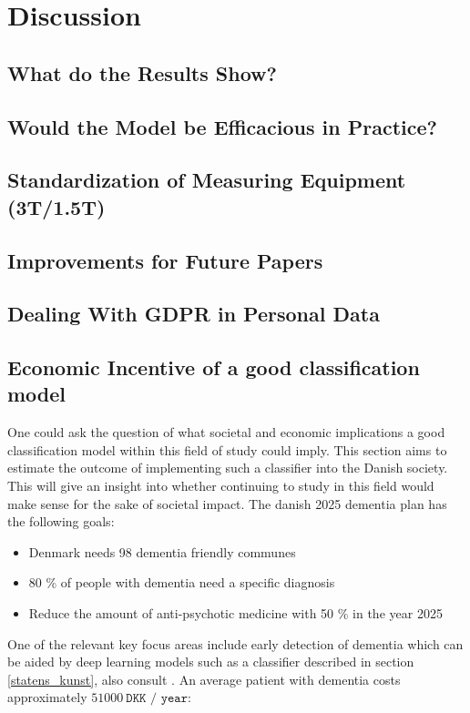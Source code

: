 \documentclass[12pt, fleqn, titlepage]{article}
\begin{document}
\section{Discussion}\label{discussion}

\subsection{What do the Results Show?}\label{discussionOfResults}

\subsection{Would the Model be Efficacious in Practice?}

\subsection{Standardization of Measuring Equipment (3T/1.5T)}

\subsection{Improvements for Future Papers}

\subsection{Dealing With GDPR in Personal Data}

\subsection{Economic Incentive of a good classification model}

One could ask the question of what societal and economic implications a good classification model within this field of study could imply. This section aims to estimate the outcome of implementing such a classifier into the Danish society. This will give an insight into whether continuing to study in this field would make sense for the sake of societal impact. The danish 2025 dementia plan has the following goals:

\begin{itemize}
	\item Denmark needs 98 dementia friendly communes
	\item 80 \% of people with dementia need a specific diagnosis 
	\item Reduce the amount of anti-psychotic medicine with 50 \% in the year 2025
\end{itemize}
\noindent
One of the relevant key focus areas include early detection of dementia which can be aided by deep learning models such as a classifier described in section \ref{statens_kunst}, also consult \cite{yudong} \cite{suk_and_shen_1} \cite{suk_and_shen_2} \cite{cheng} \cite{neuro}. An average patient with dementia costs approximately $ 51000 \ \texttt{DKK / year}$:
\end{document}
